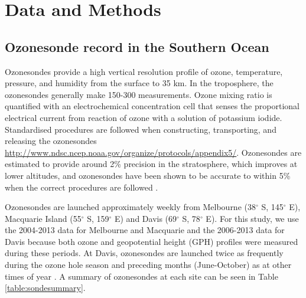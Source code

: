 
\section{Data and Methods}

  \subsection{Ozonesonde record in the Southern Ocean}
  \label{Section:ozonesondes}
    Ozonesondes provide a high vertical resolution profile of ozone, temperature, pressure, and humidity from the surface to 35 km.
    In the troposphere, the ozonesondes generally make 150-300 measurements.    
    Ozone mixing ratio is quantified with an electrochemical concentration cell that senses the proportional electrical current from reaction of ozone with a solution of potassium iodide.
    Standardised procedures are followed when constructing, transporting, and releasing the ozonesondes \url{http://www.ndsc.ncep.noaa.gov/organize/protocols/appendix5/}.
    Ozonesondes are estimated to provide around 2\% precision in the stratosphere, which improves at lower altitudes, and ozonesondes have been shown to be accurate to within 5\% when the correct procedures are followed \citep{Smit2007}.
    
    Ozonesondes are launched approximately weekly from Melbourne (38$^{\circ}$ S, 145$^{\circ}$ E), Macquarie Island (55$^{\circ}$ S, 159$^{\circ}$ E) and Davis (69$^{\circ}$ S, 78$^{\circ}$ E). 
    For this study, we use the 2004-2013 data for Melbourne and Macquarie and the 2006-2013 data for Davis because both ozone and geopotential height (GPH) profiles were measured during these periods.
    At Davis, ozonesondes are launched twice as frequently during the ozone hole season and preceding months (June-October) as at other times of year \citep{Alexander2013}.
    A summary of ozonesondes at each site can be seen in Table \ref{table:sondesummary}.
    
